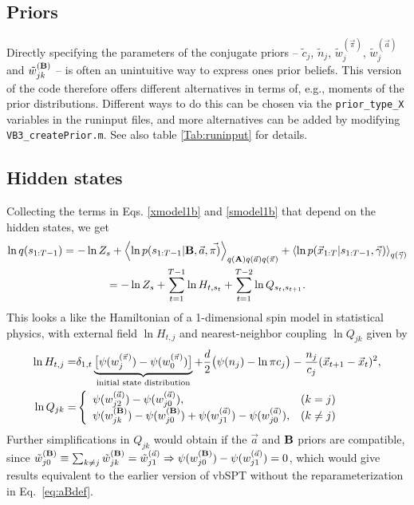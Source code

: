 \subsection{Priors}
Directly specifying the parameters of the conjugate priors -- $\tilde
c_j$, $\tilde n_j$, $\tilde w_j^{(\vec{\pi})}$, $\tilde
w_j^{(\vec{a})}$ and $\tilde w_{jk}^{(\mathbf{B})}$ -- is often an
unintuitive way to express ones prior beliefs. This version of the
code therefore offers different alternatives in terms of, e.g.,
moments of the prior distributions. Different ways to do this can be
chosen via the \texttt{prior\_type\_X} variables in the runinput
files, and more alternatives can be added by
modifying \texttt{VB3\_createPrior.m}. See also
table \ref{Tab:runinput} for details.

\subsection{Hidden states}
Collecting the terms in Eqs. \eqref{xmodel1b} and \eqref{smodel1b} that
depend on the hidden states, we get
\begin{multline}\label{VBE_qs}
 \ln q(s_{1:T-1})=
-\ln Z_s+\left\langle \ln p(s_{1:T-1}|\mathbf{B},\vec{a},\vec{\pi)}\right\rangle_{q(\mathbf{A})q(\vec a)q(\vec\pi)}
+\left\langle \ln p(\vec{x}_{1:T}|s_{1:T-1},\vec{\gamma})\right\rangle_{q(\vec\gamma)}\\
=-\ln Z_s +\sum_{t=1}^{T-1}\ln H_{t,s_t}+\sum_{t=1}^{T-2}\ln Q_{s_t,s_{t+1}}.
\end{multline}
This looks a like the Hamiltonian of a 1-dimensional spin model in
statistical physics, with external field $\ln H_{t,j}$ and
nearest-neighbor coupling $\ln Q_{jk}$ given by
\begin{align}
  \ln H_{t,j}=& \delta_{1,t}\underbrace{
    \big[\psi(w_j^{(\vec\pi)})-\psi(w_0^{(\vec\pi)})\big]
  }_{\text{initial state distribution}}
  +\frac d2\big(\psi(n_j)-\ln \pi c_j\big)-\frac{n_j}{c_j}(\vec{x}_{t+1}-\vec{x}_t)^2,
  \\
  \ln Q_{jk}=&\left\{
  \begin{array}{ll}
  \psi(w_{j2}^{(\vec{a})})-\psi(w_{j0}^{(\vec{a})}),&(k=j)\\
  \psi(w_{jk}^{(\mathbf{B})})-\psi(w_{j0}^{(\mathbf{B})})
  +
  \psi(w_{j1}^{(\vec{a})})-\psi(w_{j0}^{(\vec{a})})
  ,&(k \ne j)
  \end{array}\right.
\end{align}
Further simplifications in $Q_{jk}$ would obtain if the $\vec a$ and
$\mathbf{B}$ priors are compatible, since $\tilde
w_{j0}^{(\mathbf{B})}\equiv \sum_{k\ne j}\tilde
w_{jk}^{(\mathbf{B})}= \tilde
w_{j1}^{(\vec{a})} \Rightarrow \psi(w_{j0}^{(\mathbf{B})})
-\psi(w_{j1}^{(\vec{a})})=0$, which would give results equivalent to
the earlier version of vbSPT without the reparameterization in
Eq.~\eqref{eq:aBdef}.

